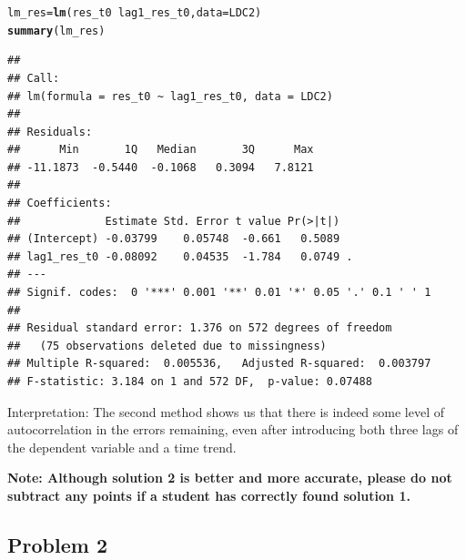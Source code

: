 \documentclass[12pt]{article}\usepackage[]{graphicx}\usepackage[]{color}
\makeatletter
\newcommand{\hlopt}[1]{\textcolor[rgb]{0,0,0}{#1}}%
\newcommand{\hlstd}[1]{\textcolor[rgb]{0.345,0.345,0.345}{#1}}%
\newcommand{\hlkwb}[1]{\textcolor[rgb]{0.69,0.353,0.396}{#1}}%
\newcommand{\hlkwc}[1]{\textcolor[rgb]{0.333,0.667,0.333}{#1}}%
\newcommand{\hlkwd}[1]{\textcolor[rgb]{0.737,0.353,0.396}{\textbf{#1}}}%
\newenvironment{kframe}{%
 \def\at@end@of@kframe{}%
 \ifinner\ifhmode%
  \def\at@end@of@kframe{\end{minipage}}%
  \begin{minipage}{\columnwidth}%
 \fi\fi%
 \def\FrameCommand##1{\hskip\@totalleftmargin \hskip-\fboxsep
 \colorbox{shadecolor}{##1}\hskip-\fboxsep
     \hskip-\linewidth \hskip-\@totalleftmargin \hskip\columnwidth}%
 \MakeFramed {\advance\hsize-\width
   \@totalleftmargin\z@ \linewidth\hsize
   \@setminipage}}%
 {\par\unskip\endMakeFramed%
 \at@end@of@kframe}
\newenvironment{knitrout}{}{} %
\makeatother
\begin{document}
\begin{knitrout}
\color{fgcolor}\begin{kframe}
\begin{alltt}
\hlstd{lm_res} \hlkwb{=} \hlkwd{lm}\hlstd{(res_t0} \hlopt{~} \hlstd{lag1_res_t0,} \hlkwc{data} \hlstd{= LDC2)}
\hlkwd{summary}\hlstd{(lm_res)}
\end{alltt}
\begin{verbatim}
## 
## Call:
## lm(formula = res_t0 ~ lag1_res_t0, data = LDC2)
## 
## Residuals:
##      Min       1Q   Median       3Q      Max 
## -11.1873  -0.5440  -0.1068   0.3094   7.8121 
## 
## Coefficients:
##             Estimate Std. Error t value Pr(>|t|)  
## (Intercept) -0.03799    0.05748  -0.661   0.5089  
## lag1_res_t0 -0.08092    0.04535  -1.784   0.0749 .
## ---
## Signif. codes:  0 '***' 0.001 '**' 0.01 '*' 0.05 '.' 0.1 ' ' 1
## 
## Residual standard error: 1.376 on 572 degrees of freedom
##   (75 observations deleted due to missingness)
## Multiple R-squared:  0.005536,	Adjusted R-squared:  0.003797 
## F-statistic: 3.184 on 1 and 572 DF,  p-value: 0.07488
\end{verbatim}
\end{kframe}
\end{knitrout}

Interpretation: The second method shows us that there is indeed some level of autocorrelation in the errors remaining, even after introducing both three lags of the dependent variable and a time trend.

\textbf{Note: Although solution 2 is better and more accurate, please do not subtract any points if a student has correctly found solution 1.}

\subsection*{Problem 2}
\end{document}
